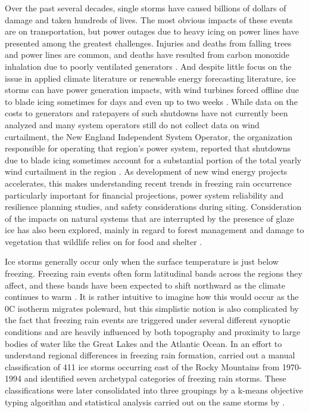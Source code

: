 \documentclass[twocol]{ametsoc}
\begin{document}
Over the past several decades, single storms have caused billions of dollars of damage and taken hundreds of lives. The most obvious impacts of these events are on transportation, but power outages due to heavy icing on power lines have presented among the greatest challenges. Injuries and deaths from falling trees and power lines are common, and deaths have resulted from carbon monoxide inhalation due to poorly ventilated generators \citep{daley2000outbreak}.  And despite little focus on the issue in applied climate literature or renewable energy forecasting literature, ice storms can have power generation impacts, with wind turbines forced offline due to blade icing sometimes for days and even up to two weeks \citep{davis2014forecast}. While data on the costs to generators and ratepayers of such shutdowns have not currently been analyzed and many system operators still do not collect data on wind curtailment, the New England Independent System Operator, the organization responsible for operating that region's power system, reported that shutdowns due to blade icing sometimes account for a substantial portion of the total yearly wind curtailment in the region \citep{bird2014wind}. As development of new wind energy projects accelerates, this makes understanding recent trends in freezing rain occurrence particularly important for financial projections, power system reliability and resilience planning studies, and safety considerations during siting. Consideration of the impacts on natural systems that are interrupted by the presence of glaze ice has also been explored, mainly in regard to forest management and damage to vegetation that wildlife relies on for food and shelter \citep{pellikka2000modelling}.

Ice storms generally occur only when the surface temperature is just below freezing. Freezing rain events often form latitudinal bands across the regions they affect, and these bands have been expected to shift northward as the climate continues to warm \citep{cheng2011possible,lambert2011simulated}. It is rather intuitive to imagine how this would occur as the 0\degree C isotherm migrates poleward, but this simplistic notion is also complicated by the fact that freezing rain events are triggered under several different synoptic conditions and are heavily influenced by both topography and proximity to large bodies of water like the Great Lakes and the Atlantic Ocean. In an effort to understand regional differences in freezing rain formation, \citet{rauber2001synoptic} carried out a manual classification of 411 ice storms occurring east of the Rocky Mountains from 1970-1994 and identified seven archetypal categories of freezing rain storms. These classifications were later consolidated into three groupings by a k-means objective typing algorithm and statistical analysis carried out on the same storms by \citet{erfani2012automated}. 
\end{document}
